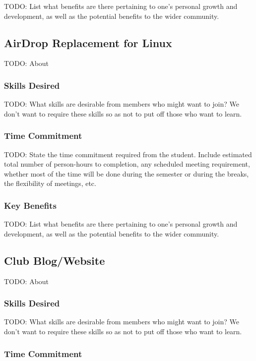 \documentclass[11pt,fleqn]{article}
\begin{document}
TODO: List what benefits are there pertaining to one's personal growth and development, as well as the potential benefits to the wider community.

\subsection{AirDrop Replacement for Linux}

TODO: About

\subsubsection*{Skills Desired}

TODO: What skills are desirable from members who might want to join?  We don't want to require these skills so as not to put off those who want to learn.

\subsubsection*{Time Commitment}

TODO: State the time commitment required from the student.  Include estimated total number of person-hours to completion, any scheduled meeting requirement, whether most of the time will be done during the semester or during the breaks, the flexibility of meetings, etc.

\subsubsection*{Key Benefits}

TODO: List what benefits are there pertaining to one's personal growth and development, as well as the potential benefits to the wider community.

\subsection{Club Blog/Website}

TODO: About

\subsubsection*{Skills Desired}

TODO: What skills are desirable from members who might want to join?  We don't want to require these skills so as not to put off those who want to learn.

\subsubsection*{Time Commitment}
\end{document}
